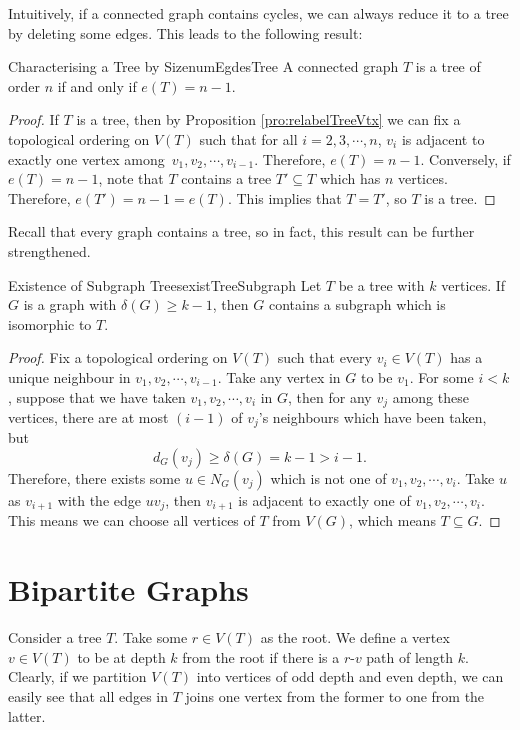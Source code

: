 \documentclass[math]{amznotes}
\theoremstyle{remark}
\begin{document}
Intuitively, if a connected graph contains cycles, we can always reduce it to a tree by deleting some edges. This leads to the following result:
\begin{corbox}{Characterising a Tree by Size}{numEgdesTree}
    A connected graph $T$ is a tree of order $n$ if and only if $e(T) = n - 1$.
    \tcblower
    \begin{proof}
        If $T$ is a tree, then by Proposition \ref{pro:relabelTreeVtx} we can fix a topological ordering on $V(T)$ such that for all $i = 2, 3, \cdots, n$, $v_i$ is adjacent to exactly one vertex among~$v_1, v_2, \cdots, v_{i - 1}$. Therefore, $e(T) = n - 1$. Conversely, if $e(T) = n - 1$, note that $T$ contains a tree $T' \subseteq T$ which has $n$ vertices. Therefore, $e(T') = n - 1 = e(T)$. This implies that $T = T'$, so $T$ is a tree.
    \end{proof}
\end{corbox}
Recall that every graph contains a tree, so in fact, this result can be further strengthened.
\begin{probox}{Existence of Subgraph Trees}{existTreeSubgraph}
    Let $T$ be a tree with $k$ vertices. If $G$ is a graph with $\delta(G) \geq k - 1$, then $G$ contains a subgraph which is isomorphic to $T$.
    \tcblower
    \begin{proof}
        Fix a topological ordering on $V(T)$ such that every $v_i \in V\left(T\right)$ has a unique neighbour in $v_1, v_2, \cdots, v_{i - 1}$. Take any vertex in $G$ to be $v_1$. For some $i < k$, suppose that we have taken $v_1, v_2, \cdots, v_i$ in $G$, then for any $v_j$ among these vertices, there are at most $(i - 1)$ of $v_j$'s neighbours which have been taken, but
        \begin{equation*}
            d_G(v_j) \geq \delta(G) = k - 1 > i - 1.
        \end{equation*}
        Therefore, there exists some $u \in N_G(v_j)$ which is not one of $v_1, v_2, \cdots, v_i$. Take $u$ as $v_{i + 1}$ with the edge $uv_j$, then $v_{i + 1}$ is adjacent to exactly one of $v_1, v_2, \cdots, v_i$. This means we can choose all vertices of $T$ from $V(G)$, which means $T \subseteq G$.
    \end{proof}
\end{probox}

\section{Bipartite Graphs}
Consider a tree $T$. Take some $r \in V(T)$ as the root. We define a vertex $v \in V(T)$ to be at depth $k$ from the root if there is a $r$-$v$ path of length $k$. Clearly, if we partition $V(T)$ into vertices of odd depth and even depth, we can easily see that all edges in $T$ joins one vertex from the former to one from the latter.
\end{document}
